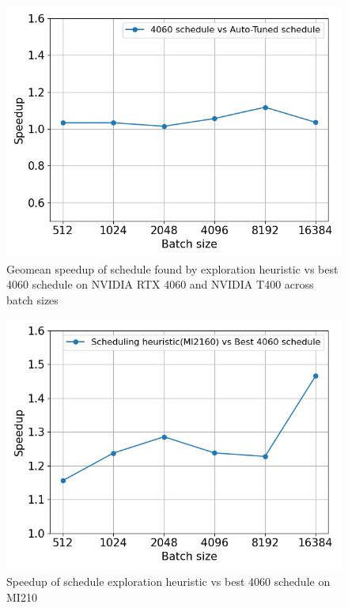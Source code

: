 \begin{figure}[htb]
  \centering
  \includegraphics[width=0.75\linewidth]{figures/geomean_speedup_T400_4060_vs_T400.png}
  \caption{Geomean speedup of schedule found by exploration heuristic vs best 4060 schedule on NVIDIA RTX 4060 and NVIDIA T400 across batch sizes}
  \label{Fig:AutotuningSpeedupvs4060Sched}
\end{figure}

\begin{figure}[htb]
  \centering
  \includegraphics[width=0.75\linewidth]{figures/geomean_speedup_AMDMI2160_4060_vs_MI2160.png}
  \caption{Speedup of schedule exploration heuristic vs best 4060 schedule on MI210}
  \label{Fig:AMD_MI210_ATHeuristicVs4060Sched_speedup}
\end{figure}

